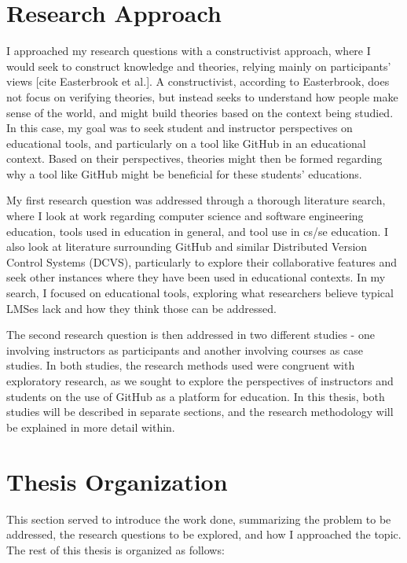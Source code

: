 \section{Research Approach}
I approached my research questions with a constructivist approach, where I would seek to construct knowledge and theories, relying mainly on participants' views [cite Easterbrook et al.]. A constructivist, according to Easterbrook, does not focus on verifying theories, but instead seeks to understand how people make sense of the world, and might build theories based on the context being studied. In this case, my goal was to seek student and instructor perspectives on educational tools, and particularly on a tool like GitHub in an educational context. Based on their perspectives, theories might then be formed regarding why a tool like GitHub might be beneficial for these students' educations.


My first research question was addressed through a thorough literature search, where I look at work regarding computer science and software engineering education, tools used in education in general, and tool use in cs/se education. I also look at literature surrounding GitHub and similar Distributed Version Control Systems (DCVS), particularly to explore their collaborative features and seek other instances where they have been used in educational contexts. In my search, I focused on educational tools, exploring what researchers believe typical LMSes lack and how they think those can be addressed.

The second research question is then addressed in two different studies - one involving instructors as participants and another involving courses as case studies. In both studies, the research methods used were congruent with exploratory research, as we sought to explore the perspectives of instructors and students on the use of GitHub as a platform for education. In this thesis, both studies will be described in separate sections, and the research methodology will be explained in more detail within.

\section{Thesis Organization}
This section served to introduce the work done, summarizing the problem to be addressed, the research questions to be explored, and how I approached the topic. The rest of this thesis is organized as follows:

